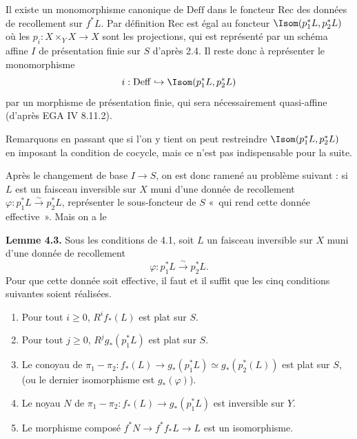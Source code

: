 Il
existe un monomorphisme canonique de \(\mathrm{Deff}\) dans le foncteur \(\mathrm{Rec}\) des données de recollement sur \(f^*L\). Par définition \(\mathrm{Rec}\) est égal au foncteur \(\Isom(p_1^*L,p_2^*L)\) où les \(p_i:X\times_YX\to X\) sont les projections, qui est représenté par un schéma affine \(I\) de présentation finie sur \(S\) d'après 2.4. Il reste donc à représenter le monomorphisme
\[
  i:\mathrm{Deff}\hookrightarrow \Isom(p_1^*L,p_2^*L)
\]
par un morphisme de présentation finie, qui sera nécessairement quasi-affine (d'après EGA IV 8.11.2).

Remarquons en passant que si l'on y tient on peut restreindre \(\Isom(p_1^*L,p_2^*L)\) en imposant la condition de cocycle, mais ce n'est pas indispensable pour la suite.

Après le changement de base \(I\to S\), on est donc ramené au problème suivant : si \(L\) est un faisceau inversible sur \(X\) muni d'une donnée de recollement \(\varphi:p_1^*L\xrightarrow{\sim}p_2^*L\), représenter le sous-foncteur de \(S\) «~qui rend cette donnée effective~». Mais on a le

\textbf{Lemme 4.3.} Sous les conditions de 4.1, soit \(L\) un faisceau inversible sur \(X\) muni d'une donnée de recollement
\[
  \varphi:p_1^*L\xrightarrow{\sim}p_2^*L.
\]
Pour que cette donnée soit effective, il faut et il suffit que les cinq conditions suivantes soient réalisées.
\begin{enumerate}[label=\arabic*)]
\item Pour tout \(i\ge0\), \(R^if_*(L)\) est plat sur \(S\).
\item Pour tout \(j\ge0\), \(R^jg_*(p_1^*L)\) est plat sur \(S\).
\item Le conoyau de \(\pi_1-\pi_2:f_*(L)\longrightarrow g_*(p_1^*L)\simeq g_*(p_2^*(L))\) est plat sur \(S\), (ou le dernier isomorphisme est \(g_*(\varphi)\)).
\item Le noyau \(N\) de \(\pi_1-\pi_2:f_*(L)\to g_*(p_1^*L)\) est inversible sur \(Y\).
\item Le morphisme composé \(f^*N\to f^*f_*L\to L\) est un isomorphisme.
\end{enumerate}
